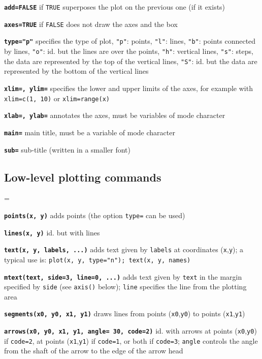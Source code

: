 \documentclass[8pt,landscape]{article}
\newcommand{\code}{\texttt}
\newcommand{\bcode}[1]{\texttt{\textbf{#1}}}
\newcommand\F{\code{FALSE}}
\newcommand\T{\code{TRUE}}
\begin{document}
\begin{multicols*}{3}
\bcode{add=FALSE}  if \T{} superposes the plot on the previous one (if it exists)

\bcode{axes=TRUE}  if \F{} does not draw the axes and the box

\bcode{type="p"}  specifies the type of plot, \code{"p"}: points, \code{"l"}: lines, \code{"b"}: points connected by lines, \code{"o"}: id. but the lines are over the points, \code{"h"}: vertical lines, \code{"s"}: steps, the data are represented by the top of the vertical lines, \code{"S"}: id. but the data are represented by the bottom of the vertical lines

\bcode{xlim=, ylim=}  specifies the lower and upper limits of the axes, for example with \code{xlim=c(1, 10)} or \code{xlim=range(x)}

\bcode{xlab=, ylab=}  annotates the axes, must be variables of mode character

\bcode{main=}  main title, must be a variable of mode character

\bcode{sub=}  sub-title (written in a smaller font)



\bigskip

\subsection{Low-level plotting commands}
\everypar={\hangindent=9mm}

\bcode{points(x, y)}  adds points (the option \code{type=} can be used)

\bcode{lines(x, y)}  id. but with lines

\bcode{text(x, y, \mbox{labels}, ...)}  adds text given by \code{labels} at coordinates (\code{x},\code{y}); a typical use is: \code{plot(x, y, type="n"); text(x, y, names)}

\bcode{mtext(text, side=3, line=0, ...)}  adds text given by \code{text} in the margin specified by \code{side} (see \code{axis()} below); \code{line} specifies the line from the plotting area

\bcode{segments(x0, y0, x1, y1)}  draws lines from points (\code{x0},\code{y0}) to points (\code{x1},\code{y1})

\bcode{arrows(x0, y0, x1, y1, angle= 30, code=2)}  id. with arrows at points (\code{x0},\code{y0}) if \code{code=2}, at points (\code{x1},\code{y1}) if \code{code=1}, or both if \code{code=3}; \code{angle} controls the angle from the shaft of the arrow to the edge of the arrow head


\end{multicols*}
\end{document}
